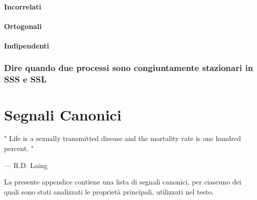 \documentclass[12pt,oneside,openany]{memoir}
\numberwithin{equation}{subsection}
\begin{document}
\subsubsection{Incorrelati}


\subsubsection{Ortogonali}


\subsubsection{Indipendenti}


\subsection{Dire quando due processi sono congiuntamente stazionari in SSS e
SSL}


\appendix


\chapter{Segnali Canonici}
\epigraph{"
	Life is a sexually transmitted disease and the mortality rate is one
	hundred percent.
"}{--- \textup{R.D. Laing}}
La presente appendice contiene una lista di segnali canonici, per ciascuno dei
quali sono stati analizzati le propriet\`a principali, utilizzati nel testo.
\end{document}
